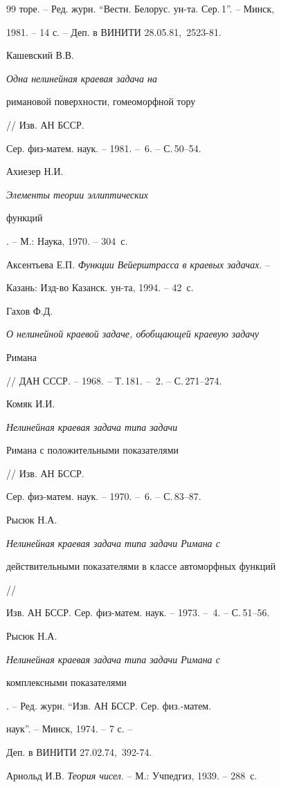 \begin{thebibliography}{99}
{торе}. -- Ред. журн. ``Вестн. Белорус. ун-та. Сер.\,1''. -- Минск,


1981. -- 14 с. -- Деп. в ВИНИТИ 28.05.81, \No\,2523-81.




Кашевский В.В. {\em Одна нелинейная краевая задача на


римановой поверхности, гомеоморфной тору} // Изв. АН БССР.


Сер. физ-матем. наук. -- 1981. -- \No\,6. -- С.\,50--54.




Ахиезер Н.И. {\em Элементы теории эллиптических


функций}. -- М.: Наука, 1970. -- 304~с.




Аксентьева Е.П. {\em Функции Вейерштрасса в краевых задачах}. --


Казань: Изд-во Казанск. ун-та, 1994. -- 42~с.




Гахов Ф.Д. {\em О нелинейной краевой задаче, обобщающей краевую задачу


Римана} // ДАН СССР. -- 1968. -- Т.\,181. -- \No\,2. -- С.\,271--274.




Комяк И.И. {\em Нелинейная краевая задача типа задачи


Римана с положительными показателями} // Изв. АН БССР.


Сер. физ-матем. наук. -- 1970. -- \No\,6. -- С.\,83--87.




Рысюк Н.А. {\em Нелинейная краевая задача типа задачи Римана с


действительными показателями в классе автоморфных функций} //


Изв. АН БССР. Сер. физ-матем. наук. -- 1973. -- \No\,4. -- С.\,51--56.




Рысюк Н.А. {\em Нелинейная краевая задача типа задачи Римана с


комплексными показателями}. -- Ред. журн. ``Изв. АН БССР. Сер. физ.-матем.


наук''. -- Минск, 1974. -- 7 с. --


Деп. в ВИНИТИ 27.02.74, \No\,392-74.




Арнольд И.В. {\em Теория чисел}. -- М.: Учпедгиз, 1939. -- 288~с.





\end{thebibliography}





\vskip 2cm












\label{end}








